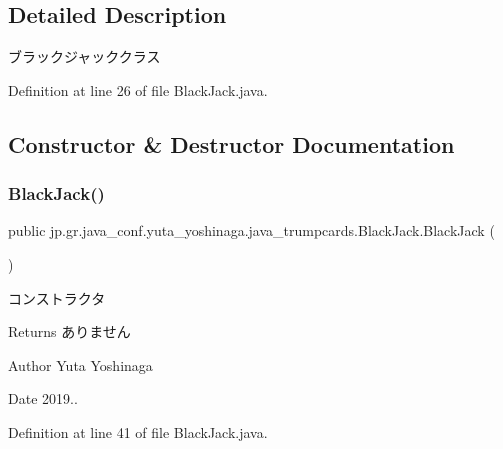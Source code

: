 \subsection{Detailed Description}
ブラックジャッククラス 

Definition at line 26 of file Black\+Jack.\+java.



\subsection{Constructor \& Destructor Documentation}
\mbox{\label{classjp_1_1gr_1_1java__conf_1_1yuta__yoshinaga_1_1java__trumpcards_1_1_black_jack_a8ec4c341c5db71243c0916980549868d}} 
\subsubsection{\texorpdfstring{Black\+Jack()}{BlackJack()}}
{\footnotesize\ttfamily public jp.\+gr.\+java\+\_\+conf.\+yuta\+\_\+yoshinaga.\+java\+\_\+trumpcards.\+Black\+Jack.\+Black\+Jack (\begin{DoxyParamCaption}{ }\end{DoxyParamCaption})}



コンストラクタ 

\begin{DoxyReturn}{Returns}
ありません 
\end{DoxyReturn}
\begin{DoxyAuthor}{Author}
Yuta Yoshinaga 
\end{DoxyAuthor}
\begin{DoxyDate}{Date}
2019.. 
\end{DoxyDate}


Definition at line 41 of file Black\+Jack.\+java.


